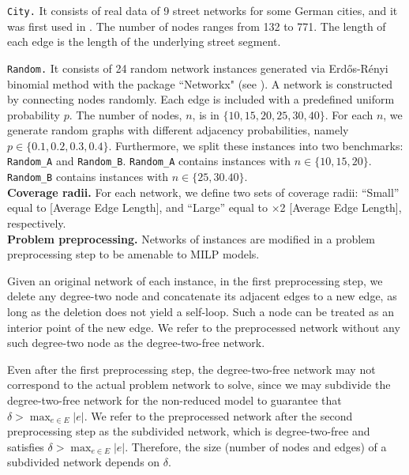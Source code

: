 \texttt{City.} It consists of real data of 9  street networks for some German cities, and it was first used in \cite{Kalsics}.  The number of nodes ranges from 132 to 771. The length of each edge is the length of the underlying street segment.

\texttt{Random.} It consists of 24  random network instances generated via Erdős-Rényi binomial method with the package ``Networkx" (see \cite{SciPyProceedings_11}).  A network is constructed by connecting nodes randomly. Each edge is included with a predefined uniform probability $p$. The number of nodes, $n$, is in $\{10, 15, 20, 25, 30, 40\}$. For each $n$, we generate random graphs with different adjacency probabilities, namely  $p \in \{0.1, 0.2, 0.3, 0.4\}$. Furthermore, we split these instances into two benchmarks: \texttt{Random\_A} and \texttt{Random\_B}.  \texttt{Random\_A} contains instances with $n \in \{10,15,20\}$.   \texttt{Random\_B} contains instances with $n \in \{25,30.40\}$. \\



\textbf{Coverage radii.}
For each network, we define two sets of coverage radii: ``Small'' equal to [Average Edge
Length], and ``Large'' equal to ×2 [Average Edge Length], respectively.
\\


\textbf{Problem preprocessing.}
Networks of instances are modified in a problem preprocessing step to be amenable to MILP models.

 Given an original network of each instance, in the first preprocessing step, we delete any degree-two node and concatenate its adjacent edges to a new edge, as long as the deletion does not yield a self-loop. Such a node can be treated as an interior point of the new edge. We refer to the preprocessed network without any such degree-two node as the degree-two-free network.


Even after the first preprocessing step,
 the degree-two-free network may not correspond to the actual problem network to solve, since we may subdivide the degree-two-free network for the non-reduced model to guarantee that $\delta > \max_{e \in E} |e|$. We refer to the preprocessed network after the second preprocessing step as the subdivided network, which is degree-two-free and satisfies $\delta > \max_{e \in E} |e|$.
 Therefore, the size (number of nodes and edges) of a subdivided network depends on $\delta$.\\


